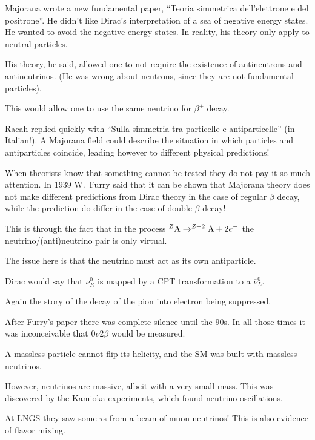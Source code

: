 \documentclass[main.tex]{subfiles}
\begin{document}
Majorana wrote a new fundamental paper, ``Teoria simmetrica dell'elettrone e del positrone''. 
He didn't like Dirac's interpretation of a sea of negative energy states. 
He wanted to avoid the negative energy states.
In reality, his theory only apply to neutral particles. 

His theory, he said, allowed one to not require the existence of antineutrons and antineutrinos. 
(He was wrong about neutrons, since they are not fundamental particles). 

This would allow one to use the same neutrino for \(\beta^{\pm}\) decay. 

Racah replied quickly with ``Sulla simmetria tra particelle e antiparticelle'' (in Italian!).
A Majorana field could describe the situation in which particles and antiparticles coincide,
leading however to different physical predictions! 

When theorists know that something cannot be tested they do not pay it so much attention.
In 1939 W.\ Furry said that it can be shown that Majorana theory does not make different predictions
from Dirac theory in the case of regular \(\beta \) decay, while the prediction do differ in the case of 
double \(\beta \) decay! 

This is through the fact that in the process \(^{Z} \ce{A} \to ^{Z+2} \ce{A} + 2 e^{-}\) 
the neutrino/(anti)neutrino pair is only virtual. 


The issue here is that the neutrino must act as its own antiparticle. 

Dirac would say that \(\nu^{0}_R\) is mapped by a CPT transformation to a \(\overline{\nu}^{0}_L\). 

Again the story of the decay of the pion into electron being suppressed. 

After Furry's paper there was complete silence until the 90s. 
In all those times it was inconceivable that \(0 \nu  2 \beta \) would be measured.

A massless particle cannot flip its helicity, and the SM was built with massless neutrinos. 

However, neutrinos are massive, albeit with a very small mass. This was discovered by the Kamioka experiments, which found neutrino oscillations. 

At LNGS they saw some \(\tau \)s from a beam of muon neutrinos! This is also evidence of flavor mixing. 
\end{document}
